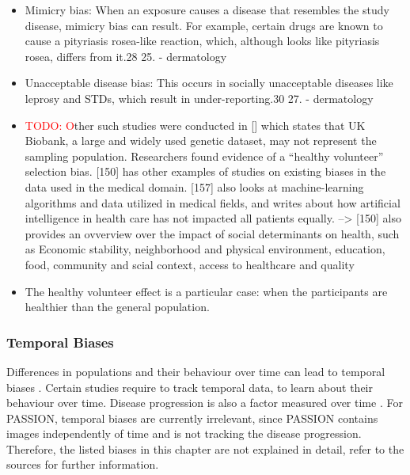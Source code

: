 \documentclass[12pt, a4paper, oneside]{book}   	%
\renewcommand{\todo}[1]{\textcolor{red}{TODO: #1}}
\renewcommand{\paragraph}[1]{%
	\subsubsection*{#1}%
}
\newif\ifrawcitationactive
\newcommand{\rawcitationend}{
	\color{black}\rawcitationactivefalse
}
\newcommand{\rawcitationusedend}{%
	\ifrawcitationactive
	\color{purple}  %
	\else
	\color{black}  %
	\fi
}
\begin{document}
\begin{itemize}
				\item  Mimicry bias: When an exposure causes a disease that resembles the study disease, mimicry bias can result. For example, certain drugs are known to cause a pityriasis rosea-like reaction, which, although looks like pityriasis rosea, differs from it.28 25.\autocite{Chakraborty_2024} - dermatology
				
				\item Unacceptable disease bias: This occurs in socially unacceptable diseases like leprosy and STDs, which result in under-reporting.30 27. \autocite{Chakraborty_2024} - dermatology
				
				\item \todo Other such studies were conducted in [\autocite{M54_Fry_2017}] which states that UK Biobank, a large and widely used genetic dataset, may not represent the sampling population. Researchers found evidence of a “healthy volunteer” selection bias. [150] has other examples of studies on existing biases in the data used in the medical domain. [157] also looks at machine-learning algorithms and data utilized in medical fields, and writes about how artificial intelligence in health care has not impacted all patients equally.\autocite{Mehrabi_2021} --> [150] also provides an ovverview over the impact of social determinants on health, such as Economic stability, neighborhood and physical environment, education, food, community and scial context, access to healthcare and quality
				\item The healthy volunteer effect is a particular case: when the participants are healthier than the general population. \autocite{Delgado-Rodriguez_2004}
				\rawcitationusedend
			\end{itemize}
			\rawcitationend
			
			\paragraph{Temporal Biases}
		    Differences in populations and their behaviour over time can lead to temporal biases \autocite{M120_Olteanu_2019}.
			Certain studies require to track temporal data, to learn about their behaviour over time. Disease progression is also a factor measured over time \autocite{Mehrabi_2021}. For PASSION, temporal biases are currently irrelevant, since PASSION contains images independently of time and is not tracking the disease progression. Therefore, the listed biases in this chapter are not explained in detail, refer to the sources for further information.
			
\end{document}
